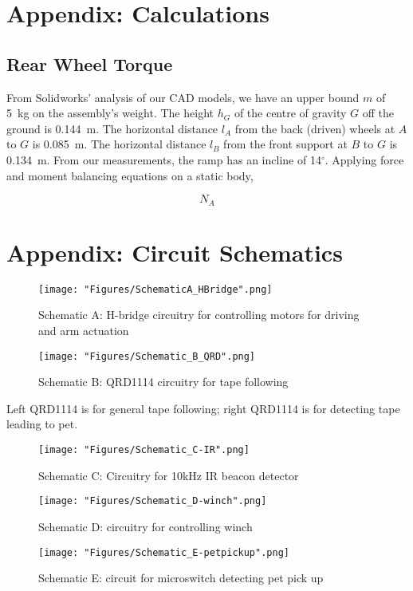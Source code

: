 \newpage
\appendix
\section{Appendix: Calculations}
\label{AppendixA}

	\subsection{Rear Wheel Torque}
	From Solidworks' analysis of our CAD models, we have an upper bound $m$ of 5~kg on the assembly's weight. The height $h_G$ of the centre of gravity $G$ off the ground is 0.144~m. The horizontal distance $l_A$ from the back (driven) wheels at $A$ to $G$ is 0.085~m. The horizontal distance $l_B$ from the front support at $B$ to $G$ is 0.134~m. From our measurements, the ramp has an incline of 14$^\circ$. Applying force and moment balancing equations on a static body,
	
	$$N_A$$
	
\newpage	
\section{Appendix: Circuit Schematics}
\label{appendixB}
\begin{figure}[h]
	\centering
	\texttt{[image: "Figures/SchematicA\_HBridge".png]}
	\caption*{Schematic A: H-bridge circuitry for controlling motors for driving and arm actuation}
	\label{sch:A}
\end{figure}
\newpage
\begin{figure}[h]
	\centering
	\texttt{[image: "Figures/Schematic\_B\_QRD".png]}
	\caption*{Schematic B: QRD1114 circuitry for tape following}
	\label{sch:B}
\end{figure}

Left QRD1114 is for general tape following; right QRD1114 is for detecting tape leading to pet.

\begin{figure}[h]
	\centering
	\texttt{[image: "Figures/Schematic\_C-IR".png]}
	\caption*{Schematic C: Circuitry for 10kHz IR beacon detector}
	\label{sch:C}
\end{figure}

\begin{figure}[h]
	\centering
	\texttt{[image: "Figures/Schematic\_D-winch".png]}
	\caption*{Schematic D: circuitry for controlling winch}
	\label{sch:D}
\end{figure}

\begin{figure}[h]
	\centering
	\texttt{[image: "Figures/Schematic\_E-petpickup".png]}
	\caption*{Schematic E: circuit for microswitch detecting pet pick up}
	\label{sch:E}
\end{figure}